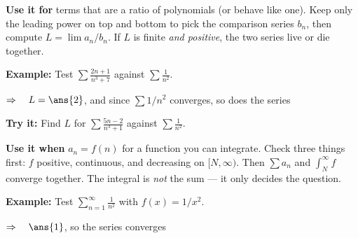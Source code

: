 \documentclass[12pt]{article}
\begin{document}


\begin{formulabox}
\textbf{Use it for} terms that are a ratio of polynomials (or behave like one). Keep only the leading power on top and bottom to pick the comparison series $b_n$, then compute $L = \lim a_n/b_n$. If $L$ is finite \emph{and positive}, the two series live or die together.
\end{formulabox}

\begin{examplebox}
\textbf{Example:} \quad Test $\displaystyle\sum \frac{2n+1}{n^{3}+7}$ against $\displaystyle\sum\frac{1}{n^{2}}$.

$\Rightarrow\quad L = \ans{2}$, and since $\sum 1/n^2$ converges, so does the series
\end{examplebox}

\begin{tryitbox}
\textbf{Try it:} \quad Find $L$ for $\displaystyle\sum \frac{5n-2}{n^{3}+1}$ against $\displaystyle\sum\frac{1}{n^{2}}$.\\[2pt]
\end{tryitbox}


\begin{formulabox}
\textbf{Use it when} $a_n = f(n)$ for a function you can integrate. Check three things first: $f$ positive, continuous, and decreasing on $[N,\infty)$. Then $\sum a_n$ and $\int_N^{\infty} f$ converge together. The integral is \emph{not} the sum --- it only decides the question.
\end{formulabox}

\begin{examplebox}
\textbf{Example:} \quad Test $\displaystyle\sum_{n=1}^{\infty}\frac{1}{n^{2}}$ with $f(x) = 1/x^{2}$.

$\Rightarrow\quad \ans{1}$, so the series converges
\end{examplebox}
\end{document}
